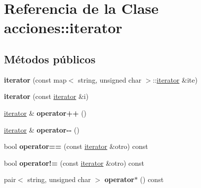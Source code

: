 \hypertarget{classacciones_1_1iterator}{}\section{Referencia de la Clase acciones\+:\+:iterator}
\label{classacciones_1_1iterator}
\subsection*{Métodos públicos}
\begin{DoxyCompactItemize}
\item 
\mbox{\label{classacciones_1_1iterator_abd7e1b30f54d21c69977c4ac78e81f10}} 
{\bfseries iterator} (const map$<$ string, unsigned char $>$\+::\hyperlink{classacciones_1_1iterator}{iterator} \&ite)
\item 
\mbox{\label{classacciones_1_1iterator_a922b08b5c8a88cf51d6fd349f3a87ba0}} 
{\bfseries iterator} (const \hyperlink{classacciones_1_1iterator}{iterator} \&i)
\item 
\mbox{\label{classacciones_1_1iterator_ab3e0ac4c4b4e2c95a50b12ca81e421c8}} 
\hyperlink{classacciones_1_1iterator}{iterator} \& {\bfseries operator++} ()
\item 
\mbox{\label{classacciones_1_1iterator_a0c27161a8f1fb4448040f52d7d7b0d73}} 
\hyperlink{classacciones_1_1iterator}{iterator} \& {\bfseries operator-\/-\/} ()
\item 
\mbox{\label{classacciones_1_1iterator_aa3de27686546e3754578124d291343b9}} 
bool {\bfseries operator==} (const \hyperlink{classacciones_1_1iterator}{iterator} \&otro) const
\item 
\mbox{\label{classacciones_1_1iterator_a5affcaa824595684032ae779d227bef6}} 
bool {\bfseries operator!=} (const \hyperlink{classacciones_1_1iterator}{iterator} \&otro) const
\item 
\mbox{\label{classacciones_1_1iterator_a002e8ed0e772fa44cb231b19c2908d34}} 
pair$<$ string, unsigned char $>$ {\bfseries operator$\ast$} () const
\end{DoxyCompactItemize}
